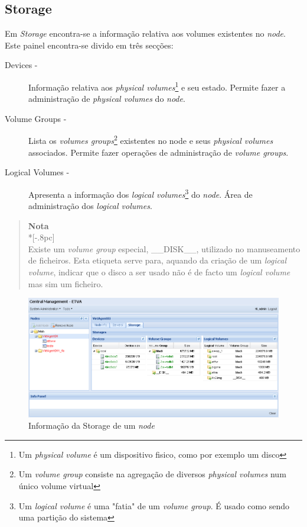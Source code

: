 \subsection{Storage}
\label{sec:storage}

Em \emph{Storage} encontra-se a informação relativa aos volumes existentes no \emph{node}.
Este painel encontra-se divido em três secções:

\begin{description}
	\item[Devices -] Informação relativa aos \emph{physical volumes}\footnote{Um \emph{physical volume} é um dispositivo fisico, como por exemplo um disco} e seu estado. Permite fazer a administração de \emph{physical volumes} do \emph{node}.
	\item[Volume Groups -] Lista os \emph{volumes groups}\footnote{Um \emph{volume group} consiste na agregação de diversos \emph{physical volumes} num único volume virtual} existentes no node e seus \emph{physical volumes} associados. Permite fazer operações de administração de \emph{volume groups}.
	\item[Logical Volumes -] Apresenta a informação dos \emph{logical volumes}\footnote{Um \emph{logical volume} é uma "fatia" de um \emph{volume group}. É usado como sendo uma partição do sistema} do \emph{node}. Área de administração dos \emph{logical volumes}.
\end{description}


\begin{quote}
	{\large \bf Nota} \\*[-.8pc]
	\underline{\hspace{6in}} \\
	Existe um \emph{volume group} especial, \_\_DISK\_\_, utilizado no manuseamento de ficheiros. Esta etiqueta serve para, aquando da criação de um \emph{logical volume}, indicar que o disco a ser usado não é de facto um \emph{logical volume} mas sim um ficheiro.
\end{quote}


\begin{figure}[H]
	\begin{center}
	\includegraphics[scale=0.5]{screenshots/node_storage.png}
	\caption{Informação da Storage de um \emph{node}}
	\label{fig:inicial}
	\end{center}
\end{figure}

